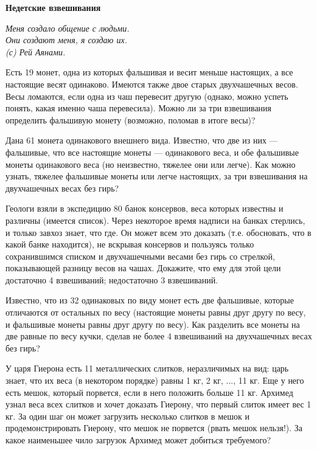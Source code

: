 \centerline{\bf \Huge Недетские взвешивания}

\begin{flushright}
        \scriptsize{\it Меня создало общение с людьми.\\
                    Они создают меня, я создаю их.\\
                    (с) Рей Аянами.}
\end{flushright}

Есть 19 монет, одна из которых фальшивая и весит меньше настоящих, а все
настоящие весят одинаково. Имеются также двое старых двухчашечных весов.
Весы ломаются, если одна из чаш перевесит другую (однако, можно успеть
понять, какая именно чаша перевесила). Можно ли за три взвешивания
определить фальшивую монету (возможно, поломав в итоге весы)?


Дана 61 монета одинакового внешнего вида. Известно, что две из них —
фальшивые, что все настоящие монеты — одинакового веса, и обе фальшивые
монеты одинакового веса (но неизвестно, тяжелее они или легче). Как
можно узнать, тяжелее фальшивые монеты или легче настоящих, за три
взвешивания на двухчашечных весах без гирь?

Геологи взяли в экспедицию 80 банок консервов, веса которых известны и
различны (имеется список). Через некоторое время надписи на банках
стерлись, и только завхоз знает, что где. Он может всем это доказать
(т.е. обосновать, что в какой банке находится), не вскрывая консервов и
пользуясь только сохранившимся списком и двухчашечными весами без гирь
со стрелкой, показывающей разницу весов на чашах. Докажите, что ему для
этой цели достаточно 4 взвешиваний; недостаточно 3 взвешиваний.



Известно, что из 32 одинаковых по виду монет есть две фальшивые, которые
отличаются от остальных по весу (настоящие монеты равны друг другу по
весу, и фальшивые монеты равны друг другу по весу). Как разделить все
монеты на две равные по весу кучки, сделав не более 4 взвешиваний на
двухчашечных весах без гирь?

У царя Гиерона есть 11 металлических слитков, неразличимых на вид: царь
знает, что их веса (в некотором порядке) равны 1 кг, 2 кг, ..., 11 кг. Еще
у него есть мешок, который порвется, если в него положить больше 11 кг.
Архимед узнал веса всех слитков и хочет доказать Гиерону, что первый
слиток имеет вес 1 кг. За один шаг он может загрузить несколько слитков
в мешок и продемонстрировать Гиерону, что мешок не порвется (рвать мешок
нельзя!). За какое наименьшее чило загрузок Архимед может добиться
требуемого?

